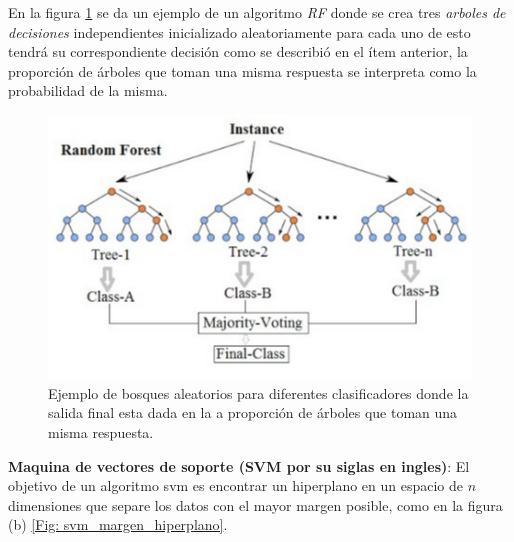 En la figura \ref{Fig: random_forest} se da un ejemplo de un algoritmo \textit{RF} donde se crea tres \textit{arboles de decisiones} independientes  inicializado aleatoriamente para cada uno de esto tendrá su correspondiente decisión como se describió en el ítem anterior, la proporción de árboles que toman una misma respuesta se interpreta como la probabilidad de la misma.

\begin{figure}[H]
 \centering
  \includegraphics[scale=0.6,keepaspectratio=true,clip=true]{imagenes/MarcoTeorico/random-forest.png}
  \caption{Ejemplo de bosques aleatorios para diferentes clasificadores donde la salida final esta dada en la a proporción de árboles que toman una misma respuesta.} 
  \label{Fig: random_forest}
\end{figure}

\par \textbf{Maquina de vectores de soporte (SVM por su siglas en ingles)}: El objetivo de un algoritmo \ac{svm} es encontrar un hiperplano en un espacio de $n$ dimensiones que separe los datos con el mayor margen posible, como en la figura (b) \ref{Fig: svm_margen_hiperplano}. 




